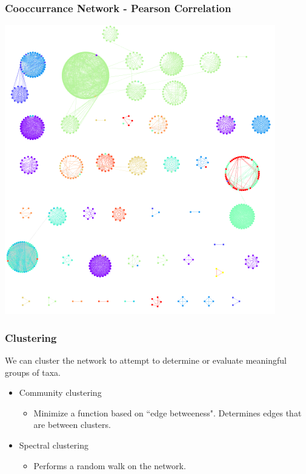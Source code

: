 \documentclass{beamer}
\begin{document}
\begin{frame}
\frametitle{Cooccurrance Network - Pearson Correlation}
\begin{center}
\includegraphics[scale = 0.4]{pearson_species.png}
\end{center}
\end{frame}
\begin{frame}
\frametitle{Clustering}
We can cluster the network to attempt to determine or evaluate meaningful groups of taxa.
\begin{itemize}
	\item Community clustering
	\begin{itemize}\item Minimize a function based on ``edge betweeness". Determines edges that are between clusters.\end{itemize}
	\item Spectral clustering
	\begin{itemize}
		\item Performs a random walk on the network.
	\end{itemize} 
\end{itemize}
\end{frame}
\end{document}
